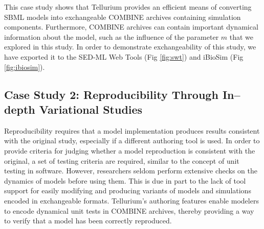 \documentclass[10pt,letterpaper]{article}
\begin{document}

This case study shows that Tellurium provides an efficient means of converting SBML models into exchangeable COMBINE archives containing simulation components. Furthermore, COMBINE archives can contain important dynamical information about the model, such as the influence of the parameter $m$ that we explored in this study. In order to demonstrate exchangeability of this study, we have exported it to the SED-ML Web Tools \cite{bergmann2017sed} (Fig \ref{fig:swt}) and iBioSim \cite{myers2009ibiosim} (Fig \ref{fig:ibiosim}).

\subsection*{Case Study 2: Reproducibility Through In--depth Variational Studies}

Reproducibility requires that a model implementation produces results consistent with the original study, especially if a different authoring tool is used. In order to provide criteria for judging whether a model reproduction is consistent with the original, a set of testing criteria are required, similar to the concept of unit testing in software.
However, researchers seldom perform extensive checks on the dynamics of models before using them. This is due in part to the lack of tool support for easily modifying and producing variants of models and simulations encoded in exchangeable formats.
Tellurium's authoring features enable modelers to encode dynamical unit tests in COMBINE archives, thereby providing a way to verify that a model has been correctly reproduced.
\end{document}
